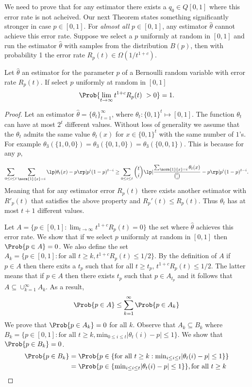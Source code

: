 We need to prove that for any estimator there exists a $q_0 \in Q[0,1]$ where this error rate is not acheived.
Our next Theorem states something significantly stronger in case $p \in [0,1]$. For \emph{almost all} $p \in [0,1]$, any estimator $\hat{\theta}$ 
cannot achieve this error rate. 
Suppose we select a $p$ uniformly at random in $[0,1]$ and run the estimator $\hat{\theta}$ with samples from the 
distribution $B(p)$, then with probability 1 the error rate $R_p(t) \in \Omega(1/t^{1+c})$.  

\begin{theorem}\label{t:lower_bound}
  Let $\hat{\theta}$ an estimator for the parameter $p$ of a Bernoulli random variable with error rate $R_p(t)$.
  If select $p$ uniformly at random in $[0,1]$
  \[
   \Prob{\lim_{t\to \infty} t^{1+c}R_{p}(t)\ > 0}=1.
  \]
\end{theorem}
\begin{proof}
Let an estimator $\hat{\theta} = \{\theta_t\}_{t=1}^{\infty}$, where $\theta_t: \{0,1\}^t\mapsto [0,1]$.
The function $\theta_t$ can have at most $2^t$ different values. Without loss of generality we assume that 
the $\theta_t$ admits the same value $\theta_t(x)$ for $x \in \{0,1\}^t$ with the same number of $1$'s. For example 
$\theta_3(\{1,0,0\})=\theta_3(\{0,1,0\})=\theta_3(\{0,0,1\})$. This is because for any $p$, 

  \[
    \sum_{0 \leq i \leq t} \sum_{\norm{1}{x} = i}
    \lp| \theta_t(x) - p \rp| p^i (1-p)^{t-i}
    \geq
    \sum_{0 \leq i \leq t} \binom{t}{i} \lp|
     \frac{\sum_{\norm{1}{x} = i} \theta_t(x)}{\binom{t}{i}}  - p \rp|
    p^i (1-p)^{t-i}.
  \]
\noindent Meaning that for any estimator error $R_p(t)$ there exists another estimator with $R'_p(t)$ that satisfies the
above property and $R_p'(t) \leq R_p(t)$. Thus $\theta_t$ has at most $t+1$ different values.

Let $A= \{p\in [0,1]: \lim_{t \to \infty}t^{1+c}R_p(t)=0\}$ the set where $\hat{\theta}$ achieves this error rate. We show
that if we select $p$ uniformly at random in $[0,1]$ then $\Prob{p \in A} =0$. We also define the set $A_k=\{p\in [0,1]: \text{for all }t \geq k, t^{1+c}R_p(t)\leq 1/2\}$.
By the definition of $A$ if $p \in A$ then there exits a $t_p$ such that for all $t\geq t_p$, $t^{1+c}R_p(t)\leq 1/2$. The latter means that
if $p \in A$ then there exists $t_p$ such that $p \in A_{t_p}$ and it follows that $A \subseteq \cup_{k=1}^{\infty}A_k$. As a result, \[\Prob{p \in A} \leq\sum_{k=1}^{\infty}\Prob{p \in A_k}\]
\noindent We prove that $\Prob{p \in A_k}=0$ for all $k$. Observe that $A_k \subseteq B_k$ where $B_k = \{p \in [0,1]: \text{for all }t\geq k, \text{min}_{0\leq i \leq t}|\theta_t(i)-p|\leq 1\}$. 
We show that $\Prob{p \in B_k}=0$.
\begin{eqnarray*}
\Prob{p \in B_k} &= \Prob{p \in \{\text{for all }t \geq k: \text{min}_{i \leq i \leq t}|\theta_t(i)-p| \leq 1 \} }\\
 &= \Prob{p \in \{\text{min}_{i \leq i \leq t}|\theta_t(i)-p| \leq 1 \}}, \text{for all } t \geq k
\end{eqnarray*}


\end{proof}

